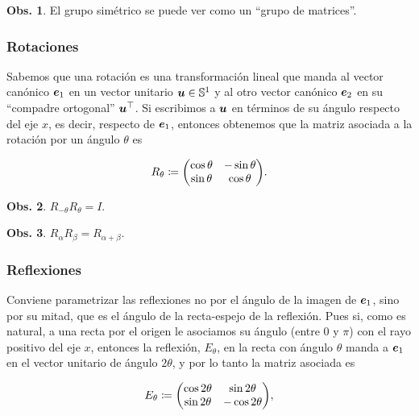 \documentclass{article}
\theoremstyle{definicion}
\theoremstyle{definition}             %
\theoremstyle{definition}             %
\theoremstyle{definition}
\theoremstyle{definition}
\theoremstyle{observacion}
\newtheorem{obs}{Obs.}
\theoremstyle{definition}
\theoremstyle{plain}
\theoremstyle{definition}
\theoremstyle{afirmacion}
\theoremstyle{notation}
\theoremstyle{definition}
\begin{document}
    \begin{obs}
        El grupo simétrico se puede ver como un ``grupo de matrices''.
    \end{obs}

    \subsubsection*{Rotaciones}

    Sabemos que una rotación es una transformación lineal que manda al vector canónico \(\vb*{e}_{1}\) en un vector unitario \(\vb*{u} \in \mathbb{S}^{1}\) y al otro vector canónico \(\vb*{e}_{2}\) en su ``compadre ortogonal'' \(\vb*{u}^{\top}\). Si escribimos a \(\vb*{u}\) en términos de su ángulo respecto del eje \(x\), es decir, respecto de \(\vb*{e}_{1}\), entonces obtenemos que la matriz asociada a la rotación por un ángulo \(\theta\) es

    \begin{equation*}
        R_{\theta} \coloneq \mqty(\cos\theta & -\sin \theta \\ \sin\theta & \cos\theta).
    \end{equation*}

    \begin{obs}
        \(R_{-\theta}R_{\theta} = I\).
    \end{obs}

    \begin{obs}
        \(R_{\alpha}R_{\beta} = R_{\alpha + \beta}\).
    \end{obs}

    \subsubsection*{Reflexiones}

    Conviene parametrizar las reflexiones no por el ángulo de la imagen de \(\vb*{e}_{1}\), sino por su mitad, que es el ángulo de la recta-espejo de la reflexión. Pues si, como es natural, a una recta por el origen le asociamos su ángulo (entre \(0\) y \(\pi\)) con el rayo positivo del eje \(x\), entonces la reflexión, \(E_{\theta}\), en la recta con ángulo \(\theta\) manda a \(\vb*{e}_{1}\) en el vector unitario de ángulo \(2\theta\), y por lo tanto la matriz asociada es
    
    \begin{equation*}
        E_{\theta} \coloneq \mqty(\cos 2\theta & \sin 2\theta\\ \sin 2\theta & -\cos 2\theta),
    \end{equation*}
\end{document}
